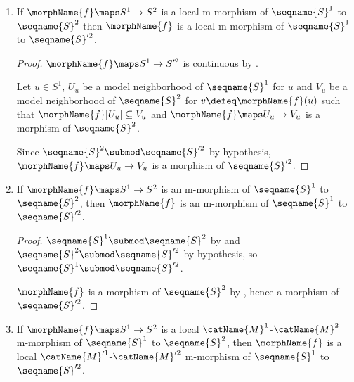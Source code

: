 \documentclass{article}
\begin{document}
\begin{lemma}
\begin{enumerate}
\begin{proof}
\begin{enumerate}
\begin{enumerate}
\item
Each
$
  \morphName{f} \maps
  \Mod(U^1_{u^1},\seqname{S}^1) \to
  \Mod(U^2_{u^1},\seqname{S}^2)
$
agrees with $\morphName{f}$ on $U^1_{u^1}$.

\item
Since $\union[{u^1 \in U^1}]{U^1_{u^1}} = U^1$ and
$\union[{u^1 \in U^1}]{U^2} = U^2$, then
$\morphName{f} \arin \catName{M}^2$ by .
\end{enumerate}
\end{enumerate}
\end{proof}

\item
\label{M-morph:localislocaltosup}
If $\morphName{f} \maps S^1 \to S^2$ is a local m-morphism of
$\seqname{S}^1$ to $\seqname{S}^2$ then $\morphName{f}$ is a local
m-morphism of $\seqname{S}^1$ to $\seqname{S}'^2$.

\begin{proof}
$\morphName{f} \maps S^1 \to S'^2$ is continuous by
.

Let $u \in S^1$, $U_u$ be a model neighborhood of $\seqname{S}^1$ for
$u$ and $V_u$ be a model neighborhood of $\seqname{S}^2$ for
$v \defeq \morphName{f}(u)$ such that $\morphName{f}[U_u] \subseteq V_u$
and $\morphName{f} \maps U_u \to  V_u$ is a morphism of $\seqname{S}^2$.

Since $\seqname{S}^2 \submod \seqname{S}'^2$ by hypothesis,
$\morphName{f} \maps U_u \to  V_u$ is a morphism of $\seqname{S}'^2$.
\end{proof}

\item
\label{M-morph:morphismorphtosup}
If $\morphName{f} \maps S^1 \to S^2$ is an m-morphism of
$\seqname{S}^1$ to $\seqname{S}^2$, then $\morphName{f}$ is an m-morphism
of $\seqname{S}^1$ to $\seqname{S}'^2$.

\begin{proof}
$\seqname{S}^1 \submod \seqname{S}^2$ by  and
$\seqname{S}^2 \submod \seqname{S}'^2$ by hypothesis, so
$\seqname{S}^1 \submod \seqname{S}'^2$.

$\morphName{f}$ is a morphism of $\seqname{S}^2$ by
, hence a morphism of $\seqname{S}'^2$.
\end{proof}

\item
\label{M-morph:catlocalislocaltosup}
If $\morphName{f} \maps S^1 \to S^2$ is a local
$\catName{M}^1$-$\catName{M}^2$ m-morphism of $\seqname{S}^1$ to
$\seqname{S}^2$, then $\morphName{f}$ is a local
$\catName{M}'^1$-$\catName{M}'^2$ m-morphism of $\seqname{S}^1$ to
$\seqname{S}'^2$.


\end{enumerate}
\end{lemma}
\end{document}

